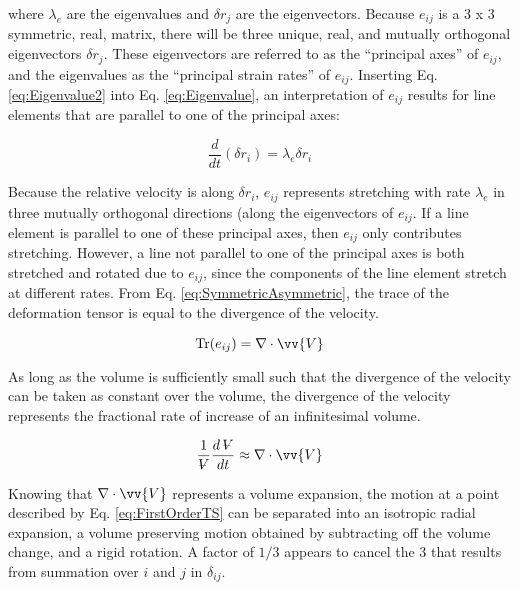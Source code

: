 \documentclass[10pt]{article}
\newcommand{\volume}{\mathop{\ooalign{\hfil$V$\hfil\cr\kern0.08em--\hfil\cr}}\nolimits}
\numberwithin{equation}{section} %
\begin{document}
where \(\lambda_e\) are the eigenvalues and \(\delta r_j\) are the eigenvectors. Because \(e_{ij}\) is a 3 x 3 symmetric, real, matrix, there will be three unique, real, and mutually orthogonal eigenvectors \(\delta r_j\). These eigenvectors are referred to as the ``principal axes'' of \(e_{ij}\), and the eigenvalues as the ``principal strain rates'' of \(e_{ij}\). Inserting Eq. \eqref{eq:Eigenvalue2} into Eq. \eqref{eq:Eigenvalue}, an interpretation of \(e_{ij}\) results for line elements that are parallel to one of the principal axes:

\begin{equation}
\label{eq:Eigenvalue3}
\frac{d}{dt}(\delta r_i)=\lambda_e \delta r_i
\end{equation}

Because the relative velocity is along \(\delta r_i\), \(e_{ij}\) represents stretching with rate \(\lambda_e\) in three mutually orthogonal directions (along the eigenvectors of \(e_{ij}\). If a line element is parallel to one of these principal axes, then \(e_{ij}\) only contributes stretching. However, a line not parallel to one of the principal axes is both stretched and rotated due to \(e_{ij}\), since the components of the line element stretch at different rates. From Eq. \eqref{eq:SymmetricAsymmetric}, the trace of the deformation tensor is equal to the divergence of the velocity.

\begin{equation}
\textrm{Tr}(e_{ij})=\nabla\cdot\vv{V}
\end{equation}

As long as the volume is sufficiently small such that the divergence of the velocity can be taken as constant over the volume, the divergence of the velocity represents the fractional rate of increase of an infinitesimal volume.

\begin{equation}
\label{eq:SignificanceofDivergence}
\frac{1}{\volume}\frac{d\volume}{dt}\approx\nabla\cdot\vv{V}
\end{equation}

Knowing that \(\nabla\cdot\vv{V}\) represents a volume expansion, the motion at a point described by Eq. \eqref{eq:FirstOrderTS} can be separated into an isotropic radial expansion, a volume preserving motion obtained by subtracting off the volume change, and a rigid rotation. A factor of \(1/3\) appears to cancel the 3 that results from summation over \(i\) and \(j\) in \(\delta_{ij}\).
\end{document}
